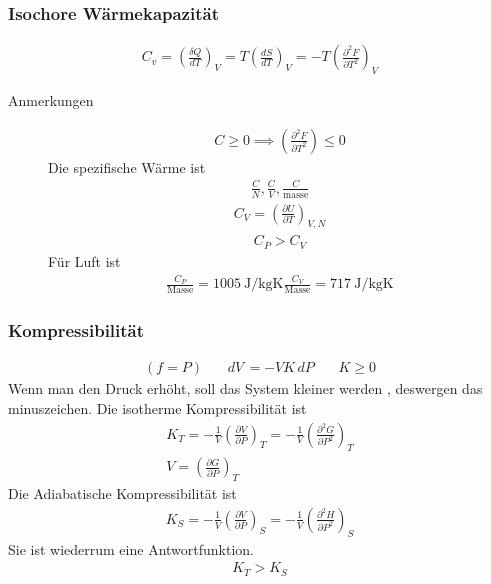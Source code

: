 \documentclass[11pt]{article}
\theoremstyle{plain}
\theoremstyle{mytheoremstyle}
\newcommand{\dd}[2]{\frac{d{#1}}{d{#2}}}
\newcommand{\pd}[2]{\frac{\partial #1 }{\partial #2}}
\renewcommand{\d}[1]{\,d#1\,}
\begin{document}
\subsubsection*{Isochore Wärmekapazität}
%
\begin{align*}
  C_v = \left(\frac{ \delta Q}{dT} \right)_V = T \left( \dd{S}{T} \right)_V
  = - T \left( \pd{^2 F}{T^2} \right)_V
\end{align*}
%
\begin{description}
  \item[Anmerkungen] 
    \begin{align*}
      C \ge 0 \implies \left( \pd{^2 F}{T^2} \right) \le 0
    \end{align*}
    Die spezifische Wärme ist
    \begin{align*}
\frac{      C}{N},\frac{ C}{V},\frac{ C}{\text{masse}}
    \end{align*}
    \begin{align*}
      C_V = \left( \pd{U}{T} \right)_{V, N}
    \end{align*}
    \begin{align*}
      C_P > C_V
    \end{align*}
    Für Luft ist 
    \begin{align*}
\frac{      C_P}{\text{Masse}} = \SI{1005}{\joule\per\kilogram\kelvin}
\frac{      C_V}{\text{Masse}} = \SI{717}{\joule\per\kilogram\kelvin}
    \end{align*}
\end{description}
\subsubsection*{Kompressibilität}
%
\begin{align*}
  (f = P) && \d{V} = - V K \d{P} && K \ge 0
\end{align*}
%
Wenn man den Druck erhöht, soll das System kleiner werden , deswergen das minuszeichen.
Die isotherme Kompressibilität ist
%
\begin{align*}
  K_T = -\frac{ 1}{V} \left( \pd{V}{P} \right)_{T} = 
  -\frac{1}{V} \left( \pd{^2 G}{P^2} \right)_T \\
  V = \left( \pd{G}{P} \right)_T
\end{align*}
%
Die Adiabatische Kompressibilität ist
\begin{align*}
  K_S = -\frac{ 1}{V} \left( \pd{V}{P} \right)_S = -\frac{ 1}{V}
  \left( \pd{^2 H}{P^2} \right)_{S}
\end{align*}
%
Sie ist wiederrum eine Antwortfunktion.
%
\begin{align*}
  K_T > K_S
\end{align*}
%
\end{document}
